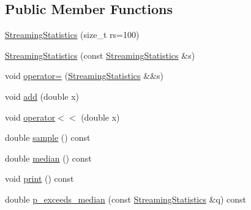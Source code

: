 \subsection*{Public Member Functions}
\begin{DoxyCompactItemize}
\item 
\hyperlink{class_fleet_1_1_statistics_1_1_streaming_statistics_a8b5aa1962f0d59bc3e18024653d13efb}{Streaming\+Statistics} (size\+\_\+t rs=100)
\item 
\hyperlink{class_fleet_1_1_statistics_1_1_streaming_statistics_ad49b1027b011502f29c9df1d211cf40d}{Streaming\+Statistics} (const \hyperlink{class_fleet_1_1_statistics_1_1_streaming_statistics}{Streaming\+Statistics} \&s)
\item 
void \hyperlink{class_fleet_1_1_statistics_1_1_streaming_statistics_a78daaf22f5e2abd44f82b2e8d2f2cb55}{operator=} (\hyperlink{class_fleet_1_1_statistics_1_1_streaming_statistics}{Streaming\+Statistics} \&\&s)
\item 
void \hyperlink{class_fleet_1_1_statistics_1_1_streaming_statistics_ad7e44e59ea2472186926250f0de54831}{add} (double x)
\item 
void \hyperlink{class_fleet_1_1_statistics_1_1_streaming_statistics_af5bcdaff2f20a0048a5b28af8582adf3}{operator$<$$<$} (double x)
\item 
double \hyperlink{class_fleet_1_1_statistics_1_1_streaming_statistics_a65b06c5de083ac12d5b74facd5444973}{sample} () const
\item 
double \hyperlink{class_fleet_1_1_statistics_1_1_streaming_statistics_a70d2554ea987b7e3278b018fdc5ca95a}{median} () const
\item 
void \hyperlink{class_fleet_1_1_statistics_1_1_streaming_statistics_acae72aac2b6ad1ce89e725c001e4e833}{print} () const
\item 
double \hyperlink{class_fleet_1_1_statistics_1_1_streaming_statistics_a0b7d6df2facb2257ec8ef7d4de68fd52}{p\+\_\+exceeds\+\_\+median} (const \hyperlink{class_fleet_1_1_statistics_1_1_streaming_statistics}{Streaming\+Statistics} \&q) const
\end{DoxyCompactItemize}
